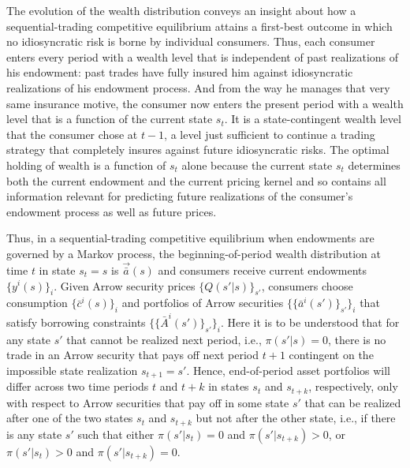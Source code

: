 The evolution of the wealth distribution conveys an
insight about how a sequential-trading competitive equilibrium
attains a first-best outcome in which no idiosyncratic risk is
borne by individual consumers. Thus, each consumer
enters every period with a wealth level that is independent of
past realizations of his endowment: past trades have
fully insured him against  idiosyncratic realizations of his
endowment process. And from the way he manages  that very same insurance motive, the consumer
now enters the present period with a wealth level that is a
function of the current state $s_t$. It is a state-contingent
wealth level that  the consumer chose at $t-1$, a level  just sufficient to
continue  a trading strategy that completely  insures against future
idiosyncratic risks. The optimal holding of wealth is  a function
 of $s_t$ alone because the current state $s_t$ determines both the
current endowment and the current pricing kernel  and so contains all information
relevant for predicting
future realizations of the consumer's endowment process as well as future prices.


Thus, in a sequential-trading competitive 
equilibrium when endowments are governed by a 
Markov process, the beginning-of-period wealth
distribution at time $t$ in state $s_t=s$
is $\vec {\bar a}(s)$ and consumers receive current
endowments $\{y^i(s)\}_i$. Given Arrow security
prices $\{Q(s'|s)\}_{s'}$, consumers choose
consumption $\{\bar c^i(s)\}_i$ and portfolios
of Arrow securities $\{\{\bar a^i(s')\}_{s'}\}_i$ 
that satisfy borrowing constraints 
$\{\{\bar A^i(s')\}_{s'}\}_i$.
Here it is to be understood that for any state $s'$
that cannot be realized next period, i.e.,
$\pi(s'|s)=0$, there is no trade in an Arrow
security that pays off next period $t+1$ 
contingent on the impossible state realization
$s_{t+1}=s'$. 
Hence, end-of-period asset portfolios will differ 
across two time periods $t$ and $t+k$ in states 
$s_t$ and $s_{t+k}$, respectively, only with
respect to Arrow securities that pay off in
some state $s'$ that can be realized
after one of the two states $s_t$ and
$s_{t+k}$ but not after the other state, i.e.,
if there is any state $s'$ such that
either $\pi(s'|s_t)=0$ and $\pi(s'|s_{t+k})>0$, 
or $\pi(s'|s_t)>0$ and 
$\pi(s'|s_{t+k})=0$.

